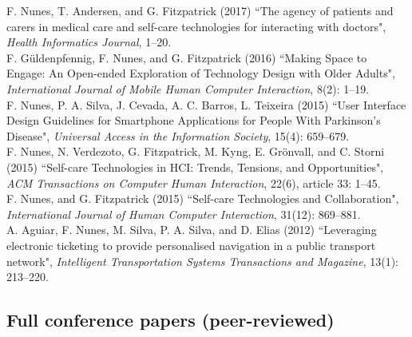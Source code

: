 \documentclass[11pt, a4paper]{article} %
\newcommand{\years}[1]{\marginnote{\scriptsize #1}} %
\begin{document}
\years{2017}F. Nunes, T. Andersen, and G. Fitzpatrick (2017) ``The agency of patients and carers in medical care and self-care technologies for interacting with doctors", \emph{Health Informatics Journal}, 1--20.\\
\years{2016}F. Güldenpfennig, F. Nunes, and G. Fitzpatrick (2016) ``Making Space to Engage: An Open-ended Exploration of Technology Design with Older Adults", \emph{International Journal of Mobile Human Computer Interaction}, 8(2): 1--19.\\
\years{2016}F. Nunes, P. A. Silva, J. Cevada, A. C. Barros, L. Teixeira (2015) ``User Interface Design Guidelines for Smartphone Applications for People With Parkinson's Disease", \emph{Universal Access in the Information Society}, 15(4): 659--679.\\
\years{2015}F. Nunes, N. Verdezoto, G. Fitzpatrick, M. Kyng, E. Grönvall, and C. Storni (2015) ``Self-care Technologies in HCI: Trends, Tensions, and Opportunities", \emph{ACM Transactions on Computer Human Interaction}, 22(6), article 33: 1--45.\\
\years{2015}F. Nunes, and G. Fitzpatrick (2015) ``Self-care Technologies and Collaboration", \emph{International Journal of Human Computer Interaction}, 31(12): 869--881.\\
\years{2012}A. Aguiar, F. Nunes, M. Silva, P. A. Silva, and D. Elias (2012) ``Leveraging electronic ticketing to provide personalised navigation in a public transport network", \emph{Intelligent Transportation Systems Transactions and Magazine}, 13(1): 213–220.


\subsection*{Full conference papers (peer-reviewed)}
\end{document}
